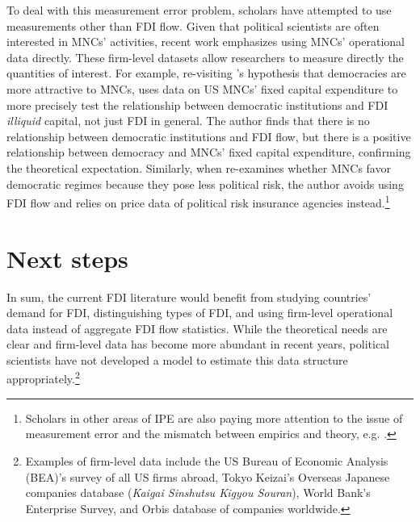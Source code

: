 To deal with this measurement error problem, scholars have attempted to use
measurements other than FDI flow. Given that political scientists are often
interested in MNCs' activities, recent work emphasizes using MNCs' operational
data directly. These firm-level datasets allow researchers to measure directly
the quantities of interest. For example, re-visiting \citet{Li2009a}'s
hypothesis that democracies are more attractive to MNCs, \citet{Kerner2014} uses
data on US MNCs' fixed capital expenditure to more precisely test the
relationship between democratic institutions and FDI \textit{illiquid} capital,
not just FDI in general. The author finds that there is no relationship between
democratic institutions and FDI flow, but there is a positive relationship
between democracy and MNCs' fixed capital expenditure, confirming the
theoretical expectation. Similarly, when \citet{Jensen2008a} re-examines whether
MNCs favor democratic regimes because they pose less political risk, the author
avoids using FDI flow and relies on price data of political risk insurance
agencies instead.\footnote{Scholars in other areas of IPE are also paying more
  attention to the issue of measurement error and the mismatch between empirics
  and theory, e.g. \citep{Karcher2013}.}

\section{Next steps}

In sum, the current FDI literature would benefit from studying countries'
demand for FDI, distinguishing types of FDI, and using firm-level
operational data instead of aggregate FDI flow statistics. While the theoretical
needs are clear and firm-level data has become more abundant in recent years,
political scientists have not developed a model to estimate this data structure
appropriately.\footnote{Examples of firm-level data include the US Bureau of
  Economic Analysis (BEA)'s survey of all US firms abroad, Tokyo Keizai's
  Overseas Japanese companies database (\textit{Kaigai Sinshutsu Kigyou
    Souran}), World Bank's Enterprise Survey, and Orbis database of companies
  worldwide.}

